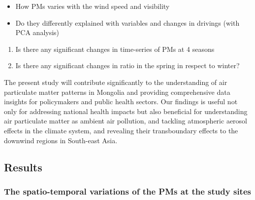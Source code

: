 \documentclass[
  11pt,
]{article}
\providecommand{\tightlist}{%
  \setlength{\itemsep}{0pt}\setlength{\parskip}{0pt}}
\begin{document}
\begin{itemize}
\tightlist
\item
  How PMs varies with the wind speed and visibility
\item
  Do they differently explained with variables and changes in drivings
  (with PCA analysis)
\end{itemize}

\begin{enumerate}
\def\labelenumi{\arabic{enumi}.}
\setcounter{enumi}{4}
\tightlist
\item
  Is there any significant changes in time-series of PMs at 4 seasons
\item
  Is there any significant changes in ratio in the spring in respect to
  winter?
\end{enumerate}

The present study will contribute significantly to the understanding of
air particulate matter patterns in Mongolia and providing comprehensive
data insights for policymakers and public health sectors. Our findings
is useful not only for addressing national health impacts but also
beneficial for understanding air particulate matter as ambient air
pollution, and tackling atmospheric aerosol effects in the climate
system, and revealing their transboundary effects to the downwind
regions in South-east Asia.

\subsection{Results}\label{results}

\subsubsection{The spatio-temporal variations of the PMs at the study
sites}\label{the-spatio-temporal-variations-of-the-pms-at-the-study-sites}
\end{document}
